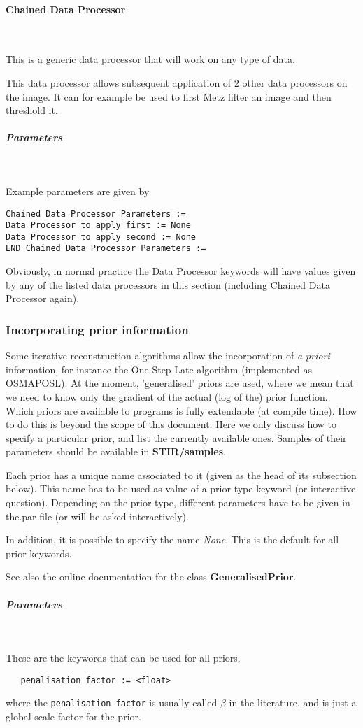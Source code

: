 \documentclass{article}
\newcommand{\subsubsubsection}[1]{\paragraph{#1}\mbox{} \\}
\newcommand{\subsubsubsubsection}[1]{\subparagraph{#1} \mbox{} \\}
\begin{document}
{{{{ \subsubsubsection{Chained Data Processor}
}
This is a generic data processor that will work on any type of data.

This data processor allows subsequent application of 2 other 
data processors on the image. It can for example be used to 
first Metz filter an image and then threshold it.

{ \subsubsubsubsection{Parameters}
}
Example parameters are given by
\begin{verbatim}
Chained Data Processor Parameters :=
Data Processor to apply first := None
Data Processor to apply second := None
END Chained Data Processor Parameters :=
\end{verbatim}

Obviously, in normal practice the Data Processor keywords will 
have values given by any of the listed data processors in this 
section (including Chained Data Processor again).



\subsubsection{
Incorporating prior information}
\label{sec:priors}
Some iterative reconstruction algorithms allow the incorporation 
of \textit{a priori} information, for instance the One Step Late algorithm 
(implemented as OSMAPOSL). At the moment, 'generalised' priors 
are used, where we mean that we need to know only the gradient 
of the actual (log of the) prior function.\\
Which priors are available to programs is fully extendable (at 
compile time). How to do this is beyond the scope of this document. 
Here we only discuss how to specify a particular prior, and list 
the currently available ones. Samples of their parameters should 
be available in \textbf{STIR/samples}.



Each prior has a unique name associated to it (given as the head 
of its subsection below). This name has to be used as value of 
a prior type keyword (or interactive question). Depending on 
the prior type, different parameters have to be given in the.par 
file (or will be asked interactively).


In addition, it is possible to specify the name \textit{None}. This 
is the default for all prior keywords.


See also the online documentation for the class \textbf{GeneralisedPrior}.


{ \subsubsubsubsection{Parameters}
}
These are the keywords that can be used for all priors.
  \begin{verbatim}
   penalisation factor := <float>
  \end{verbatim}
  \noindent where the \texttt{penalisation factor} is usually called
  $\beta$ in the literature, and is just a global scale factor for the
  prior.

}}}
\end{document}
